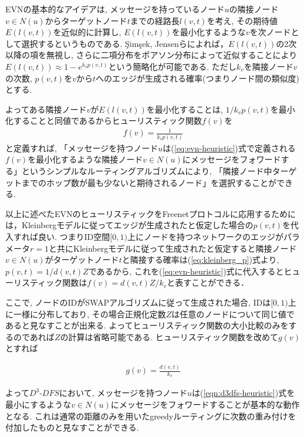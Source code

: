 \documentclass[technicalreport]{./ieicej-v3.0/UTF/ieicej}
\begin{document}
   EVNの基本的なアイデアは, メッセージを持っているノード$u$の隣接ノード$v \in N(u)$からターゲットノード$t$までの経路長$l(v,t)$を考え, その期待値$E(l(v,t))$を近似的に計算し, $E(l(v,t))$を最小化するような$v$を次ノードとして選択するというものである. {\c{S}}im{\c{s}}ek, Jensenらによれば，$E(l(v,t))$の2次以降の項を無視し, さらに二項分布をポアソン分布によって近似することにより$E(l(v,t)) \approx 1- e^{k_vp(v,t)}$という簡略化が可能である. ただし$k_v$を隣接ノード$v$の次数, $p(v,t)$を$v$から$t$へのエッジが生成される確率(つまりノード間の類似度)とする.

    よってある隣接ノード$v$が$E(l(v,t))$を最小化することは, $1/k_vp(v,t)$を最小化することと同値であるからヒューリスティック関数$f(v)$を
    \begin{eqnarray}
     f(v) = \frac{1}{k_vp(v,t)}\label{eq:evn-heuristic}
    \end{eqnarray}
    と定義すれば, 「メッセージを持つノード$u$は(\ref{eq:evn-heuristic})式で定義される$f(v)$を最小化するような隣接ノード$v \in N(u)$にメッセージをフォワードする」というシンプルなルーティングアルゴリズムにより, 「隣接ノード中ターゲットまでのホップ数が最も少ないと期待されるノード」を選択することができる.

    以上に述べたEVNのヒューリスティックをFreenetプロトコルに応用するためには，Kleinbergモデルに従ってエッジが生成されたと仮定した場合の$p(v,t)$を代入すれば良い. つまりID空間$[0,1)$上にノードを持つネットワークのエッジがパラメータ$r=1$と共にKleinbergモデルに従って生成されたと仮定すると隣接ノード$v \in N(u)$がターゲットノード$t$と隣接する確率は(\ref{eq:kleinberg_p})式より, $p(v,t) = 1/d(v,t)Z$であるから, これを(\ref{eq:evn-heuristic})式に代入するとヒューリスティック関数は$f(v) = d(v,t)Z/k_v$と表すことができる．

ここで, ノードのIDがSWAPアルゴリズムに従って生成された場合, IDは$[0,1)$上に一様に分布しており, その場合正規化定数$Z$は任意のノードについて同じ値であると見なすことが出来る. よってヒューリスティック関数の大小比較のみをするのであれば$Z$の計算は省略可能である. ヒューリスティック関数を改めて$g(v)$とすれば

\begin{eqnarray}
g(v) = \frac{d(v,t)}{k_v} \label{eqn:d3dfs-heuristic}
\end{eqnarray}

よって$D^3$-$DFS$において, メッセージを持つノード$u$は(\ref{eqn:d3dfs-heuristic})式を最小にするような$v \in N(u)$にメッセージをフォワードすることが基本的な動作となる. これは通常の距離のみを用いたgreedyルーティングに次数の重み付けを付加したものと見なすことができる.
\end{document}
